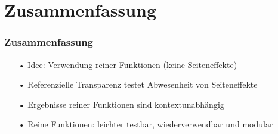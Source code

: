 \section[Section]{Zusammenfassung}
	\begin{frame}[fragile]
	\frametitle{Zusammenfassung}


\begin{itemize}
		\item[•] Idee: Verwendung reiner Funktionen (keine Seiteneffekte)
		\item[•] Referenzielle Transparenz testet Abwesenheit von Seiteneffekte
		\item[•] Ergebnisse reiner Funktionen sind kontextunabhängig
		\item[•] Reine Funktionen: leichter testbar, wiederverwendbar und modular
\end{itemize} 

\end{frame}